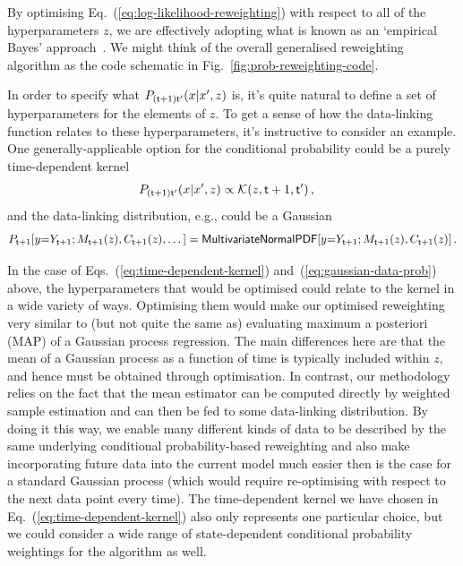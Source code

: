 By optimising Eq.~(\ref{eq:log-likelihood-reweighting}) with respect to all of the hyperparameters $z$, we are effectively adopting what is known as an `empirical Bayes' approach~\cite{murphy2012machine, mackay2003information}. We might think of the overall generalised reweighting algorithm as the code schematic in Fig.~\ref{fig:prob-reweighting-code}.

In order to specify what $P_{({\sf t}+1){\sf t}'}(x\vert x',z)$ is, it's quite natural to define a set of hyperparameters for the elements of $z$. To get a sense of how the data-linking function relates to these hyperparameters, it's instructive to consider an example. One generally-applicable option for the conditional probability could be a purely time-dependent kernel
\begin{align}
P_{({\sf t}+1){\sf t}'}(x\vert x',z) &\propto {\cal K}(z, {\sf t}+1,{\sf t}')  \label{eq:time-dependent-kernel} \,, 
\end{align}
and the data-linking distribution, e.g., could be a Gaussian
\begin{align}
P_{{\sf t}+1}[y{=}Y_{{\sf t}+1};M_{{\sf t}+1}(z),C_{{\sf t}+1}(z),\dots ] = {\sf MultivariateNormalPDF}[y{=}Y_{{\sf t}+1};M_{{\sf t}+1}(z),C_{{\sf t}+1}(z)] \label{eq:gaussian-data-prob}\,.
\end{align}

In the case of Eqs.~(\ref{eq:time-dependent-kernel}) and~(\ref{eq:gaussian-data-prob}) above, the hyperparameters that would be optimised could relate to the kernel in a wide variety of ways. Optimising them would make our optimised reweighting very similar to (but not quite the same as) evaluating maximum a posteriori (MAP) of a Gaussian process regression. The main differences here are that the mean of a Gaussian process as a function of time is typically included within $z$, and hence must be obtained through optimisation. In contrast, our methodology relies on the fact that the mean estimator can be computed directly by weighted sample estimation and can then be fed to some data-linking distribution. By doing it this way, we enable many different kinds of data to be described by the same underlying conditional probability-based reweighting and also make incorporating future data into the current model much easier then is the case for a standard Gaussian process (which would require re-optimising with respect to the next data point every time). The time-dependent kernel we have chosen in Eq.~(\ref{eq:time-dependent-kernel}) also only represents one particular choice, but we could consider a wide range of state-dependent conditional probability weightings for the algorithm as well. 


